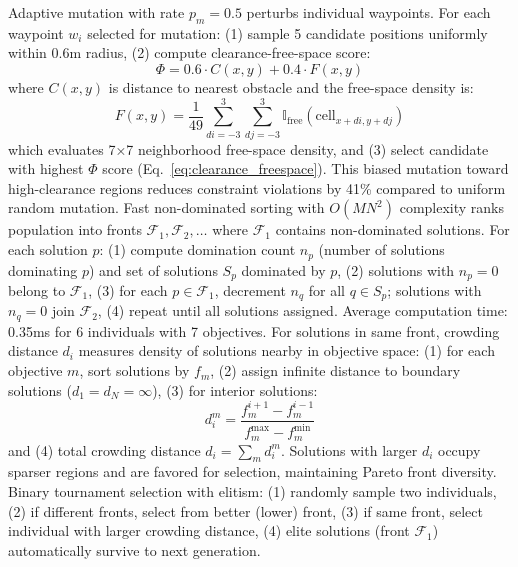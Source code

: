 \documentclass[pdflatex,sn-nature]{sn-jnl}%
\begin{document}
Adaptive mutation with rate $p_m = 0.5$ perturbs individual waypoints. For each waypoint $w_i$ selected for mutation: (1) sample 5 candidate positions uniformly within 0.6m radius, (2) compute clearance-free-space score:
\begin{equation}
\Phi = 0.6 \cdot C(x, y) + 0.4 \cdot F(x, y)
\label{eq:clearance_freespace}
\end{equation}
where $C(x,y)$ is distance to nearest obstacle and the free-space density is:
\begin{equation}
F(x,y) = \frac{1}{49}\sum_{di=-3}^{3}\sum_{dj=-3}^{3} \mathbb{I}_{\text{free}}(\text{cell}_{x+di,y+dj})
\label{eq:freespace_density}
\end{equation}
which evaluates 7×7 neighborhood free-space density, and (3) select candidate with highest $\Phi$ score (Eq.~\ref{eq:clearance_freespace}). This biased mutation toward high-clearance regions reduces constraint violations by 41\% compared to uniform random mutation. Fast non-dominated sorting with $O(MN^2)$ complexity ranks population into fronts $\mathcal{F}_1, \mathcal{F}_2, \ldots$ where $\mathcal{F}_1$ contains non-dominated solutions. For each solution $p$: (1) compute domination count $n_p$ (number of solutions dominating $p$) and set of solutions $S_p$ dominated by $p$, (2) solutions with $n_p=0$ belong to $\mathcal{F}_1$, (3) for each $p \in \mathcal{F}_1$, decrement $n_q$ for all $q \in S_p$; solutions with $n_q=0$ join $\mathcal{F}_2$, (4) repeat until all solutions assigned. Average computation time: 0.35ms for 6 individuals with 7 objectives. For solutions in same front, crowding distance $d_i$ measures density of solutions nearby in objective space: (1) for each objective $m$, sort solutions by $f_m$, (2) assign infinite distance to boundary solutions ($d_1 = d_N = \infty$), (3) for interior solutions:
\begin{equation}
d_i^m = \frac{f_m^{i+1} - f_m^{i-1}}{f_m^{\max} - f_m^{\min}}
\label{eq:crowding_distance}
\end{equation}
and (4) total crowding distance $d_i = \sum_m d_i^m$. Solutions with larger $d_i$ occupy sparser regions and are favored for selection, maintaining Pareto front diversity. Binary tournament selection with elitism: (1) randomly sample two individuals, (2) if different fronts, select from better (lower) front, (3) if same front, select individual with larger crowding distance, (4) elite solutions (front $\mathcal{F}_1$) automatically survive to next generation.
\end{document}
